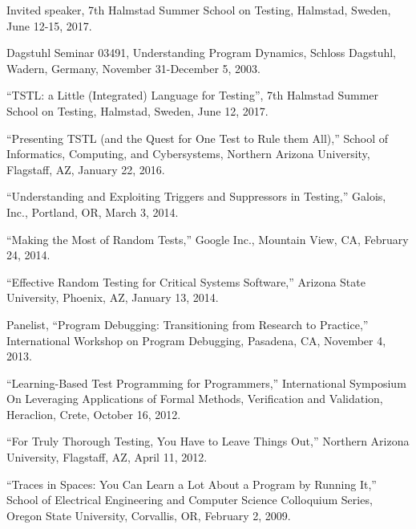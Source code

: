 \documentclass[ComputerScience]{vita}
\begin{document}
\begin{vita}
\begin{Invited Seminars}
\item Invited speaker, 7th Halmstad Summer School on Testing, Halmstad, Sweden, June 12-15, 2017.

  \item Dagstuhl Seminar 03491, Understanding Program Dynamics, Schloss Dagstuhl, Wadern, Germany, November 31-December 5, 2003.
\end{Invited Seminars}

\begin{Invited Talks and Panels}
\item ``TSTL: a Little (Integrated) Language for Testing'', 7th Halmstad Summer School on Testing, Halmstad, Sweden, June 12, 2017.

\item ``Presenting TSTL (and the Quest for One Test to Rule them All),'' School of Informatics, Computing, and Cybersystems, Northern Arizona University, Flagstaff, AZ, January 22, 2016.

\item ``Understanding and Exploiting Triggers and Suppressors in Testing,'' Galois, Inc., Portland, OR, March 3, 2014.

\item ``Making the Most of Random Tests,'' Google Inc., Mountain View, CA, February 24, 2014.

\item ``Effective Random Testing for Critical Systems Software,'' Arizona State University, Phoenix, AZ, January 13, 2014.

\item Panelist, ``Program Debugging: Transitioning from Research to Practice,'' International Workshop on Program Debugging, Pasadena, CA, November 4, 2013. 

\item ``Learning-Based Test Programming for Programmers,'' International Symposium On Leveraging Applications of Formal Methods, Verification and Validation, Heraclion, Crete, October 16, 2012.

\item ``For Truly Thorough Testing, You Have to Leave Things Out,'' Northern Arizona University, Flagstaff, AZ, April 11, 2012.

\item ``Traces in Spaces:   You Can Learn a Lot About a Program by Running It,'' School of Electrical Engineering and Computer Science Colloquium Series, Oregon State University, Corvallis, OR, February 2, 2009.


\end{Invited Talks and Panels}
\end{vita}
\end{document}
